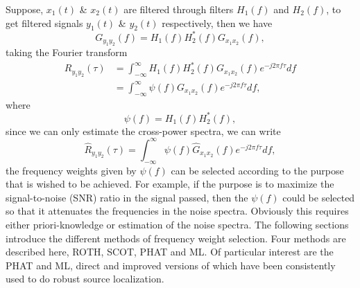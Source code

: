 Suppose, $x_1(t)$ \& $x_2(t)$ are filtered through filters $H_1(f)$ and $H_2(f)$, to get filtered signals $y_1(t)$ \& $y_2(t)$ respectively, then we have
\begin{equation}
        G_{y_1y_2}(f) = H_1(f)H^*_2(f) G_{x_1x_2}(f),
\end{equation}
taking the Fourier transform
\begin{equation}
\begin{split}
            R_{y_1y_2}(\tau) &= \int_{-\infty}^{\infty}H_1(f)H^*_2(f) G_{x_1x_2}(f) e^{-j2\pi f\tau} df \\
                             &= \int_{-\infty}^{\infty}\psi(f) G_{x_1x_2}(f) e^{-j2\pi f\tau} df,
\end{split}
\end{equation}
where 
\begin{equation}
            \psi(f) = H_1(f)H^*_2(f),
\end{equation}
since we can only estimate the cross-power spectra, we can write
\begin{equation}
            \hat{R}_{y_1y_2}(\tau) = \int_{-\infty}^{\infty}\psi(f) \hat{G}_{x_1x_2}(f) e^{-j2\pi f\tau} df,
\end{equation}
the frequency weights given by $\psi(f)$ can be selected according to the purpose that is wished to be achieved. For example, if the purpose is to maximize the signal-to-noise (SNR) ratio in the signal passed, then the $\psi(f)$ could be selected so that it attenuates the frequencies in the noise spectra. Obviously this requires either priori-knowledge or estimation of the noise spectra. The following sections introduce the different methods of frequency weight selection. Four methods are described here, ROTH, SCOT, PHAT and ML. Of particular interest are the PHAT and ML, direct and improved versions of which have been consistently used to do robust source localization. 

